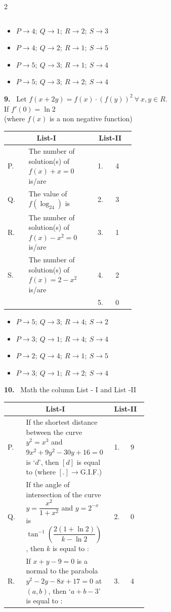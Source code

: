 \documentclass[10pt]{extarticle}
\newcommand{\qn}[1]{\par\smallskip\noindent\textbf{#1.}~}
\newenvironment{qoptions}{\begin{itemize}[leftmargin=1.8em,itemsep=1pt,topsep=2pt,label={}]}{\end{itemize}}
\newcommand{\opt}[2]{\item[(#1)] #2}
\begin{document}
\begin{multicols}{2}
\begin{center}
\begin{tabular}{|l|p{0.55\linewidth}|c|l|}
\end{tabular}
\end{center}
\begin{qoptions}
\opt{A}{$P\to4;\ Q\to1;\ R\to2;\ S\to3$}
\opt{B}{$P\to4;\ Q\to2;\ R\to1;\ S\to5$}
\opt{C}{$P\to5;\ Q\to3;\ R\to1;\ S\to4$}
\opt{D}{$P\to5;\ Q\to3;\ R\to2;\ S\to4$}
\end{qoptions}
\qn{9} Let $f(x+2y)=f(x)\cdot(f(y))^2\ \forall\ x,y\in R$.\\
If $f'(0)=\ln2$\\
(where $f(x)$ is a non negative function)
\begin{center}\small
\begin{tabular}{|l|p{0.5\linewidth}|c|l|}\hline
\multicolumn{2}{|c|}{\textbf{List-I}} & \multicolumn{2}{c|}{\textbf{List-II}}\\\hline
P. & The number of solution(s) of $f(x)+x=0$ is/are & 1. & 4\\\hline
Q. & The value of $f(\log_24)$ is & 2. & 3\\\hline
R. & The number of solution(s) of $f(x)-x^2=0$ is/are & 3. & 1\\\hline
S. & The number of solution(s) of $f(x)=2-x^2$ is/are & 4. & 2\\\hline
 & & 5. & 0\\\hline
\end{tabular}
\end{center}
\begin{qoptions}
\opt{A}{$P\to5;\ Q\to3;\ R\to4;\ S\to2$}
\opt{B}{$P\to3;\ Q\to1;\ R\to4;\ S\to4$}
\opt{C}{$P\to2;\ Q\to4;\ R\to1;\ S\to5$}
\opt{D}{$P\to3;\ Q\to1;\ R\to2;\ S\to4$}
\end{qoptions}
\qn{10} Math the column List - I and List -II
\begin{center}\small
\begin{tabular}{|l|p{0.55\linewidth}|c|l|}\hline
\multicolumn{2}{|c|}{\textbf{List-I}} & \multicolumn{2}{c|}{\textbf{List-II}}\\\hline
P. & If the shortest distance between the curve $y^2=x^3$ and $9x^2+9y^2-30y+16=0$ is `$d$', then $[d]$ is equal to (where $[.]\to$G.I.F.) & 1. & 9\\\hline
Q. & If the angle of intersection of the curve $y=\dfrac{x^2}{1+x^2}$ and $y=2^{-x}$ is $\tan^{-1}\left(\dfrac{2(1+\ln2)}{k-\ln2}\right)$, then $k$ is equal to : & 2. & 0\\\hline
R. & If $x+y-9=0$ is a normal to the parabola $y^2-2y-8x+17=0$ at $(a,b)$, then `$a+b-3$' is equal to : & 3. & 4\\\hline

\end{tabular}
\end{center}
\end{multicols}
\end{document}
